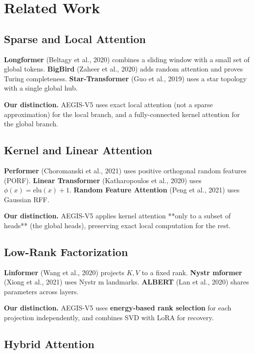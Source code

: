 \section{Related Work}

\subsection{Sparse and Local Attention}

\textbf{Longformer} (Beltagy et al., 2020) combines a sliding window with a small 
set of global tokens. \textbf{BigBird} (Zaheer et al., 2020) adds random 
attention and proves Turing completeness. \textbf{Star-Transformer} (Guo et al., 
2019) uses a star topology with a single global hub.

\textbf{Our distinction.} AEGIS-V5 uses exact local attention (not a sparse 
approximation) for the local branch, and a fully-connected kernel 
attention for the global branch.

\subsection{Kernel and Linear Attention}

\textbf{Performer} (Choromanski et al., 2021) uses positive orthogonal random 
features (PORF). \textbf{Linear Transformer} (Katharopoulos et al., 2020) uses 
$\phi(x) = \text{elu}(x) + 1$. \textbf{Random Feature Attention} (Peng et al., 
2021) uses Gaussian RFF.

\textbf{Our distinction.} AEGIS-V5 applies kernel attention **only to a subset 
of heads** (the global heads), preserving exact local computation for the 
rest.

\subsection{Low-Rank Factorization}

\textbf{Linformer} (Wang et al., 2020) projects $K, V$ to a fixed rank. 
\textbf{Nystr mformer} (Xiong et al., 2021) uses Nystr m landmarks. \textbf{ALBERT} 
(Lan et al., 2020) shares parameters across layers.

\textbf{Our distinction.} AEGIS-V5 uses \textbf{energy-based rank selection} for each 
projection independently, and combines SVD with LoRA for recovery.

\subsection{Hybrid Attention}


